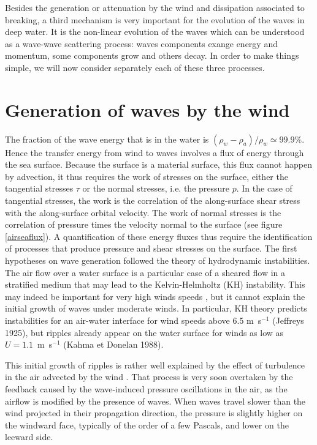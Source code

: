 

Besides the generation or attenuation by the wind and dissipation associated to breaking, a third mechanism is very important for the 
evolution of the waves in deep water. It is the non-linear evolution of the waves which can be understood as a wave-wave scattering process: waves components 
exange energy and momentum, some components grow and others decay. In order to make things simple, we will now consider separately each of these three processes. 

\section{Generation of waves by the wind}
The fraction of the wave energy that is in the water is $(\rho_w -\rho_a)/\rho_w \simeq 99.9$\%. Hence the transfer energy from wind to waves 
involves a flux of energy through the sea surface. Because the surface is a material surface, this flux cannot happen by advection, it thus requires the 
work of stresses on the surface, either the tangential stresses $\tau$ or the normal stresses, i.e. the pressure $p$. In the case of tangential stresses, 
the work is the correlation of 
the along-surface shear stress with the along-surface orbital velocity. The work of normal stresses is the correlation of pressure times the velocity normal to the surface
 (see figure \ref{airseaflux}). A quantification of these energy fluxes thus require the identification of processes that produce pressure and shear stresses on the surface. 
The first hypotheses on wave generation followed the theory of hydrodynamic instabilities. The air flow over a water surface is a particular case of a sheared flow in a stratified 
medium that may lead to the Kelvin-Helmholtz (KH) instability. This may indeed be important for very high winds speeds \citep{Soloviev&al.2014}, but it cannot explain the 
initial growth of waves under moderate winds. In particular, KH theory predicts instabilities for an air-water interface for wind speeds above 6.5 m~s$^{-1}$ (Jeffreys 1925), 
but ripples already appear on the water surface for winds as low as  $U= 1.1$~m~s$^{-1}$
(Kahma et Donelan 1988\nocite{Kahma&Donelan1988}). 

This initial growth of ripples is rather well explained by the effect of turbulence in the air advected by the wind \cite{Phillips1957}. 
That process is very soon overtaken by the feedback caused by the wave-induced pressure oscillations in the air, as the airflow is modified by the presence of waves. 
 When waves travel slower than the wind projected in their propagation direction, the pressure is slightly higher on the windward face, typically of the order of a few Pascals,
and lower on the leeward side. 


